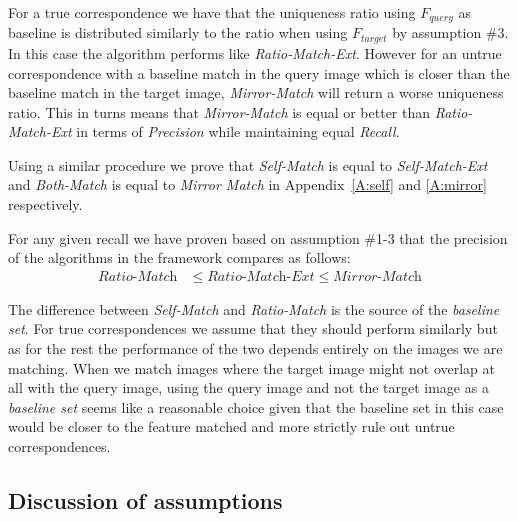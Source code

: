 \documentclass[journal]{IEEEtran}
\begin{document}
For a true correspondence we have that the uniqueness ratio using 
$F_{query}$ as baseline is distributed similarly to the ratio when using 
$F_{target}$ by assumption \#3. In this case the algorithm performs like 
\emph{Ratio-Match-Ext}.  However for an untrue correspondence with a 
baseline match in the query image which is closer than the
baseline match in the target image, \emph{Mirror-Match} will return a 
worse uniqueness ratio. This in turns means that \emph{Mirror-Match} is 
equal or better than \emph{Ratio-Match-Ext} in terms of  
\emph{Precision} while maintaining equal \emph{Recall}.

Using a similar procedure we prove that \emph{Self-Match} is equal to
\emph{Self-Match-Ext} and \emph{Both-Match} is equal to \emph{Mirror
Match} in Appendix~\ref{A:self} and \ref{A:mirror} respectively.

For any given recall we have proven based on assumption \#1-3 that the 
precision of the algorithms in the framework compares as follows:
\begin{align*}
    \textit{Ratio-Match} &\leq \textit{Ratio-Match-Ext} \leq 
    \textit{Mirror-Match}
\end{align*}

The difference between \emph{Self-Match} and \emph{Ratio-Match} is
the source of the \emph{baseline set}. For true correspondences we 
assume that they should perform similarly but as for the rest the 
performance of the two depends entirely on the images we are matching. 
When we match images where the target image might not overlap at all 
with the query image, using the query image and not the target image as 
a \emph{baseline set} seems like a reasonable choice given that the 
baseline set in this case would be closer to the feature matched and 
more strictly rule out untrue correspondences.


\subsection{Discussion of assumptions}
\label{ref:disc_assumptions}


\end{document}
